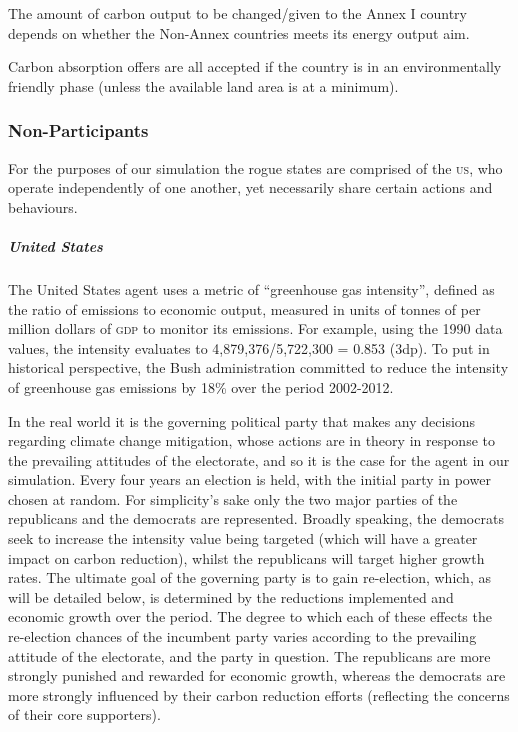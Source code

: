 The amount of carbon output to be changed/given to the Annex I country depends on whether the Non-Annex countries meets its energy output aim.

Carbon absorption offers are all accepted if the country is in an environmentally friendly phase (unless the available land area is at a minimum). 

\subsubsection{Non-Participants}

For the purposes of our simulation the rogue states are comprised of the \textsc{us}, who operate independently of one another, yet necessarily share certain actions and behaviours. 

\subparagraph{United States}

The United States agent uses a metric of ``greenhouse gas intensity'', defined as the ratio of emissions to economic output, measured in units of tonnes of \CO per million dollars of \textsc{gdp} to monitor its emissions. For example, using the 1990 data values, the intensity evaluates to 4,879,376/5,722,300 = 0.853 (3dp). To put in historical perspective, the Bush administration committed to reduce the intensity of greenhouse gas emissions by 18\% over the period 2002-2012.

In the real world it is the governing political party that makes any decisions regarding climate change mitigation, whose actions are in theory in response to the prevailing attitudes of the electorate, and so it is the case for the agent in our simulation. Every four years an election is held, with the initial party in power chosen at random. For simplicity's sake only the two major parties of the republicans and the democrats are represented. Broadly speaking, the democrats seek to increase the intensity value being targeted (which will have a greater impact on carbon reduction), whilst the republicans will target higher growth rates. The ultimate goal of the governing party is to gain re-election, which, as will be detailed below, is determined by the reductions implemented and economic growth over the period. The degree to which each of these effects the re-election chances of the incumbent party varies according to the prevailing attitude of the electorate, and the party in question. The republicans are more strongly punished and rewarded for economic growth, whereas the democrats are more strongly influenced by their carbon reduction efforts (reflecting the concerns of their core supporters). 

